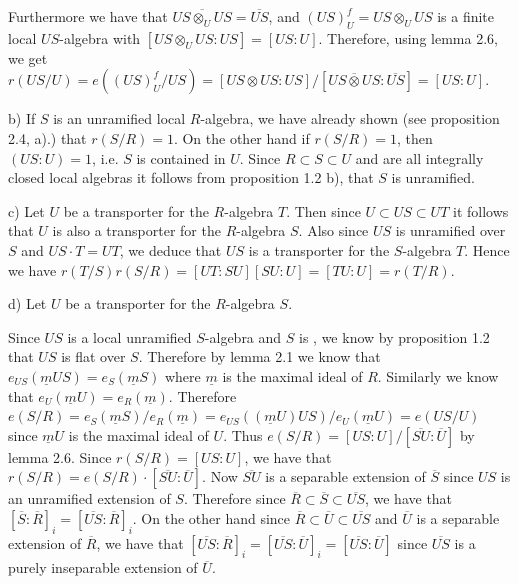 Furthermore we have that $\overline{US\otimes_U US}=\overline{US}$, and $(US)_U^f=US\otimes_U US$ is a finite
local $US$-algebra with $[US\otimes_U US:US]=[US:U]$. Therefore, using
lemma 2.6, we get $r(US/U)=e((US)_U^f/US)=[US\otimes US:US]/[\overline{US\otimes US}:\overline{US}]=
[US:U]$.

b) If $S$ is an unramified local $R$-algebra, we have already shown (see
proposition 2.4, a).) that $r(S/R)=1$. On the other hand if $r(S/R)=1$,
then $(US:U)=1$, i.e. $S$ is contained in $U$. Since $R\subset S\subset U$ and are all
integrally closed local algebras it follows from proposition 1.2 b), that
$S$ is unramified.

c) Let $U$ be a transporter for the $R$-algebra $T$. Then since
$U\subset US\subset UT$ it follows that $U$ is also a transporter for the $R$-algebra $S$.
Also since $US$ is unramified over $S$ and $US\cdot T=UT$, we deduce that $US$ is a
transporter for the $S$-algebra $T$. Hence we have $r(T/S)r(S/R)=
[UT:SU][SU:U]=[TU:U]=r(T/R)$.

d) Let $U$ be a transporter for the $R$-algebra $S$.

Since $US$ is a local unramified $S$-algebra and $S$ is ,  we know by
proposition 1.2 that $US$ is flat over $S$. Therefore by lemma 2.1 we know
that $e_{US}(\underline m US)=e_S(\underline m S)$ where $\underline m$ is the maximal ideal of $R$. Similarly we
know that $e_U(\underline m U)=e_R(\underline m)$. Therefore $e(S/R)=e_S(\underline m S)/e_R(\underline m)=
e_{US}((\underline m U)US)/e_U(\underline m U)=e(US/U)$ since $\underline m U$ is the maximal ideal of $U$. Thus
$e(S/R)=[US:U]/[\overline{SU}:\overline U]$ by lemma 2.6. Since $r(S/R)=[US:U]$, we have
that $r(S/R)=e(S/R)\cdot[\overline{SU}:\overline U]$. Now $\overline{SU}$ is a separable extension of $\overline S$ since
$US$ is an unramified extension of $S$. Therefore since $\overline R\subset\overline S\subset\overline{US}$, we have
that $[\overline S:\overline R]_i=[\overline{US}:\overline R]_i$. On the other hand since $\overline R\subset\overline U\subset\overline{US}$ and $\overline U$ is a
separable extension of $\overline R$, we have that $[\overline{US}:\overline R]_i=[\overline{US}:\overline U]_i=[\overline{US}:\overline U]$
since $\overline{US}$ is a purely inseparable extension of $\overline U$.
